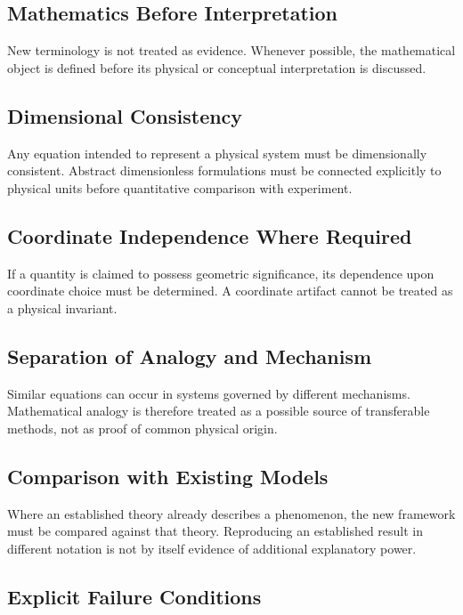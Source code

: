 \documentclass[12pt,oneside]{book}
\begin{document}
\subsection{Mathematics Before Interpretation}

New terminology is not treated as evidence. Whenever possible,
the mathematical object is defined before its physical or
conceptual interpretation is discussed.

\subsection{Dimensional Consistency}

Any equation intended to represent a physical system must be
dimensionally consistent. Abstract dimensionless formulations
must be connected explicitly to physical units before
quantitative comparison with experiment.

\subsection{Coordinate Independence Where Required}

If a quantity is claimed to possess geometric significance, its
dependence upon coordinate choice must be determined. A
coordinate artifact cannot be treated as a physical invariant.

\subsection{Separation of Analogy and Mechanism}

Similar equations can occur in systems governed by different
mechanisms. Mathematical analogy is therefore treated as a
possible source of transferable methods, not as proof of common
physical origin.

\subsection{Comparison with Existing Models}

Where an established theory already describes a phenomenon, the
new framework must be compared against that theory. Reproducing
an established result in different notation is not by itself
evidence of additional explanatory power.

\subsection{Explicit Failure Conditions}
\end{document}
